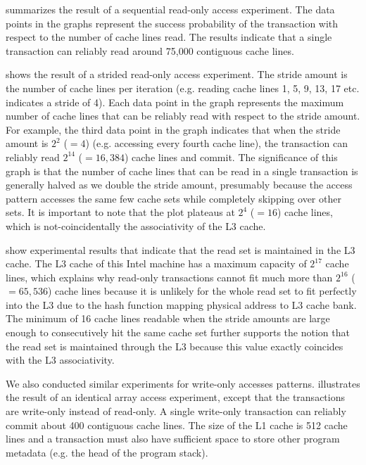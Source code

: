  summarizes the result of a sequential
read-only access experiment. The data points in the graphs represent the success
probability of the transaction with respect to the number of cache lines read.
The results indicate that a single transaction can reliably read 
around 75,000 contiguous cache lines.

 shows the result of a strided read-only
access experiment. The stride amount is the number of cache lines per
iteration (e.g. reading cache lines 1, 5, 9, 13, 17 etc. 
indicates a stride of 4). Each data point in the graph 
represents the maximum number of cache
lines that can be reliably read with respect 
to the stride amount. For example,
the third data point in the graph indicates 
that when the stride amount is
$2^2$ ($=4$) (e.g. accessing every fourth cache line), 
the transaction can reliably read
$2^{14}$ ($=16,384$) cache lines and commit. 
The significance of this graph is that
the number of cache lines that can be read in a 
single transaction is generally
halved as we double the stride amount, presumably 
because the access pattern
accesses the same few cache sets while 
completely skipping over other sets.
It is important to note that the plot plateaus 
at $2^4$ ($=16$) cache lines, which is not-coincidentally
the associativity of the {L3} cache.

 show experimental results that indicate
that the read set is maintained in the
{L3} cache. The {L3} cache of this Intel machine has a maximum
capacity of $2^{17}$ cache lines, which explains 
why read-only transactions
cannot fit much more than $2^{16}$ ($=65,536$) 
cache lines because it is unlikely
for the whole read set to fit perfectly into the {L3} due to
the hash function mapping physical address to L3 cache bank. 
The minimum of 16
cache lines readable when the stride amounts 
are large enough to consecutively
hit the same cache set further supports the notion that the read set is
maintained through the {L3} because this value exactly coincides 
with the L3 associativity.

We also conducted similar experiments for write-only accesses
patterns.   illustrates 
the result of an
identical array access experiment, except that the 
transactions are write-only
instead of read-only. A single write-only transaction 
can reliably commit about 400 contiguous cache lines. The
size of the {L1} cache is 512 cache lines and a transaction must also
have sufficient space to store other program metadata (e.g. the
head of the program stack). 

